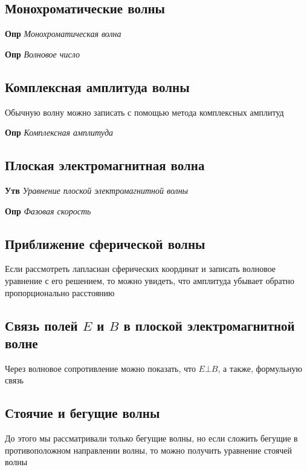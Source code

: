 \documentclass[a4paper, 14pt]{article}
\begin{document}
    \subsection{Монохроматические волны}
    
    \textbf{Опр} \textit{Монохроматическая волна}
    
    \textbf{Опр} \textit{Волновое число}
    
    \subsection{Комплексная амплитуда волны}
    
    Обычную волну можно записать с помощью метода комплексных амплитуд
    
    \textbf{Опр} \textit{Комплексная амплитуда}
    
    \subsection{Плоская электромагнитная волна}
    
    \textbf{Утв} \textit{Уравнение плоской электромагнитной волны}
    
    \textbf{Опр} \textit{Фазовая скорость}
    
    \subsection{Приближение сферической волны}
    
    Если рассмотреть лапласиан сферических координат и записать волновое уравнение с его решением, то можно увидеть,
    что амплитуда убывает обратно пропорционально расстоянию
    
    \subsection{Связь полей $E$ и $B$ в плоской электромагнитной волне}
    
    Через волновое сопротивление можно показать, что $E \bot B$, а также, формульную связь
    
    \subsection{Стоячие и бегущие волны}
    
    До этого мы рассматривали только бегущие волны, но если сложить бегущие в противоположном направлении волны, то
    можно получить уравнение стоячей волны
    
\end{document}
